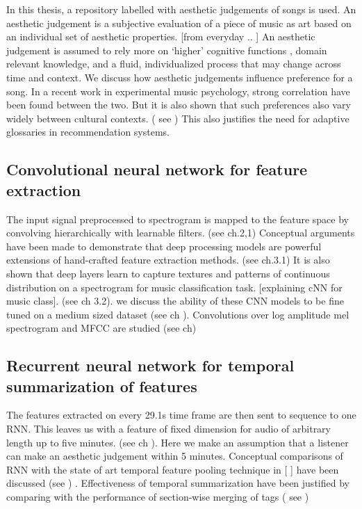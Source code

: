 In this thesis, a repository labelled with aesthetic judgements of songs is used. An aesthetic judgement is a subjective evaluation of a piece of music as art based on an individual set of aesthetic properties. [from everyday .. ] An aesthetic judgement is assumed to rely more on ‘higher’ cognitive functions , domain relevant knowledge, and a fluid, individualized process that may change across time and context. We discuss how aesthetic judgements influence preference for a song. In a recent work in experimental music psychology, strong correlation have been found between the two. But it is also shown that such preferences also vary widely between cultural contexts. ( see ) This also justifies the need for adaptive glossaries in recommendation systems. 

\subsection{Convolutional neural network for feature extraction}
The input signal preprocessed to spectrogram is mapped to the feature space by convolving hierarchically with learnable filters. (see ch.2,1) Conceptual arguments have been made to demonstrate that deep processing models are powerful extensions of hand-crafted feature extraction methods\cite{Yann}. (see ch.3.1) It is also shown that deep layers learn to capture textures and patterns of continuous distribution on a spectrogram for music classification task. [explaining cNN for music class]. (see ch 3.2).  we discuss the ability of these CNN models to be fine tuned on a medium sized dataset (see ch ). Convolutions over log amplitude mel spectrogram and MFCC are studied (see ch)



\subsection{ Recurrent neural network for temporal summarization of features}
 The features extracted on every 29.1s time frame are then sent to sequence to one RNN. This leaves us with a feature of fixed dimension for audio of arbitrary length up to five minutes. (see ch ). Here we make an assumption that a listener can make an aesthetic judgement within 5 minutes. Conceptual comparisons of RNN with the state of art temporal feature pooling technique in [ ] have been discussed (see ) . Effectiveness of temporal summarization have been justified by comparing with the performance of section-wise merging of tags ( see )

